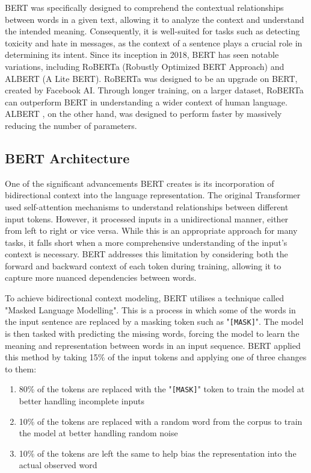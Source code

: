 BERT was specifically designed to comprehend the contextual relationships between words in a given text, allowing it to analyze the context and understand the intended meaning. Consequently, it is well-suited for tasks such as detecting toxicity and hate in messages, as the context of a sentence plays a crucial role in determining its intent. Since its inception in 2018, BERT has seen notable variations, including RoBERTa (Robustly Optimized BERT Approach) and ALBERT (A Lite BERT). RoBERTa \cite{RoBERTa} was designed to be an upgrade on BERT, created by Facebook AI. Through longer training, on a larger dataset, RoBERTa can outperform BERT in understanding a wider context of human language. ALBERT \cite{AlBERT}, on the other hand, was designed to perform faster by massively reducing the number of parameters.

\subsection{BERT Architecture}

One of the significant advancements BERT creates is its incorporation of bidirectional context into the language representation. The original Transformer used self-attention mechanisms to understand relationships between different input tokens. However, it processed inputs in a unidirectional manner, either from left to right or vice versa. While this is an appropriate approach for many tasks, it falls short when a more comprehensive understanding of the input's context is necessary. BERT addresses this limitation by considering both the forward and backward context of each token during training, allowing it to capture more nuanced dependencies between words.

To achieve bidirectional context modeling, BERT utilises a technique called "Masked Language Modelling". This is a process in which some of the words in the input sentence are replaced by a masking token such as "\verb|[MASK]|". The model is then tasked with predicting the missing words, forcing the model to learn the meaning and representation between words in an input sequence. BERT applied this method by taking 15\% of the input tokens and applying one of three changes to them:

\begin{enumerate}[itemsep=0pt, topsep=1pt]
    \item 80\% of the tokens are replaced with the "\verb|[MASK]|" token to train the model at better handling incomplete inputs
    \item 10\% of the tokens are replaced with a random word from the corpus to train the model at better handling random noise
    \item 10\% of the tokens are left the same to help bias the representation into the actual observed word
\end{enumerate}

